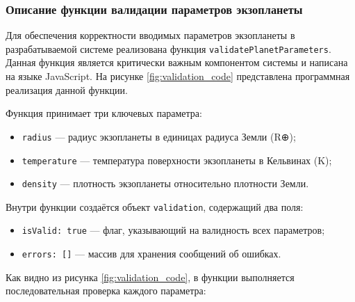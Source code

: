 \subsubsection{Описание функции валидации параметров экзопланеты}

Для обеспечения корректности вводимых параметров экзопланеты в разрабатываемой системе реализована функция \texttt{validatePlanetParameters}. Данная функция является критически важным компонентом системы и написана на языке JavaScript. На рисунке \ref{fig:validation_code} представлена программная реализация данной функции.

Функция принимает три ключевых параметра:
\begin{itemize}
    \item \texttt{radius} --- радиус экзопланеты в единицах радиуса Земли (R⊕);
    \item \texttt{temperature} --- температура поверхности экзопланеты в Кельвинах (K);
    \item \texttt{density} --- плотность экзопланеты относительно плотности Земли.
\end{itemize}

Внутри функции создаётся объект \texttt{validation}, содержащий два поля:
\begin{itemize}
    \item \texttt{isValid: true} --- флаг, указывающий на валидность всех параметров;
    \item \texttt{errors: []} --- массив для хранения сообщений об ошибках.
\end{itemize}

Как видно из рисунка \ref{fig:validation_code}, в функции выполняется последовательная проверка каждого параметра:

